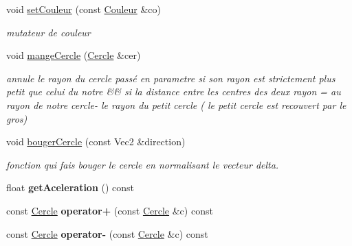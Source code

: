 \begin{DoxyCompactItemize}
\mbox{\label{class_cercle_a52397d378b01d5193b1acc094d137b07}} 
void \mbox{\hyperlink{class_cercle_a52397d378b01d5193b1acc094d137b07}{set\+Couleur}} (const \mbox{\hyperlink{class_couleur}{Couleur}} \&co)
\begin{DoxyCompactList}\small\item\em mutateur de couleur \end{DoxyCompactList}\item 
\mbox{\label{class_cercle_ae9470ceaa5f6f487e1d1eaa3efe53255}} 
void \mbox{\hyperlink{class_cercle_ae9470ceaa5f6f487e1d1eaa3efe53255}{mange\+Cercle}} (\mbox{\hyperlink{class_cercle}{Cercle}} \&cer)
\begin{DoxyCompactList}\small\item\em annule le rayon du cercle passé en parametre si son rayon est strictement plus petit que celui du notre \&\& si la distance entre les centres des deux rayon = au rayon de notre cercle-\/ le rayon du petit cercle ( le petit cercle est recouvert par le gros) \end{DoxyCompactList}\item 
\mbox{\label{class_cercle_ad918390b34c7c779e71c6a427509af43}} 
void \mbox{\hyperlink{class_cercle_ad918390b34c7c779e71c6a427509af43}{bouger\+Cercle}} (const Vec2 \&direction)
\begin{DoxyCompactList}\small\item\em fonction qui fais bouger le cercle en normalisant le vecteur delta. \end{DoxyCompactList}\item 
\mbox{\label{class_cercle_a688b755c24f2c2ee34f28a7b8b135374}} 
float {\bfseries get\+Aceleration} () const
\item 
\mbox{\label{class_cercle_ab6151c028c869e88899895e16d93dca1}} 
const \mbox{\hyperlink{class_cercle}{Cercle}} {\bfseries operator+} (const \mbox{\hyperlink{class_cercle}{Cercle}} \&c) const
\item 
\mbox{\label{class_cercle_a09d2a463117bf46c8fd77d45b32416d7}} 
const \mbox{\hyperlink{class_cercle}{Cercle}} {\bfseries operator-\/} (const \mbox{\hyperlink{class_cercle}{Cercle}} \&c) const
\item 
\mbox{\label{class_cercle_a4a0a86593dcea67db4182f700b338de3}} 

\end{DoxyCompactItemize}
